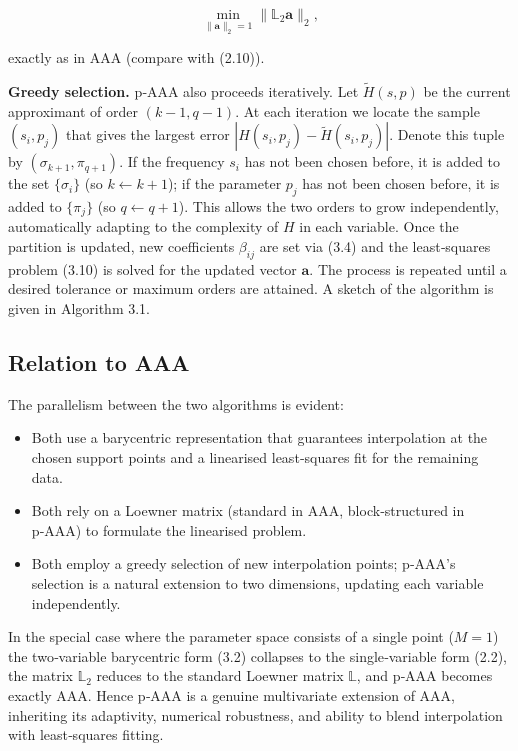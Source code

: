 \documentclass{article}
\begin{document}
\[
\min_{\|\mathbf{a}\|_2=1}\|\mathbb{L}_2\mathbf{a}\|_2,
\tag{3.10}
\]

exactly as in AAA (compare with (2.10)).

\textbf{Greedy selection.} p‑AAA also proceeds iteratively. Let \(\tilde{H}(s,p)\) be the current approximant of order \((k-1,q-1)\). At each iteration we locate the sample \((s_i,p_j)\) that gives the largest error \(|H(s_i,p_j)-\tilde{H}(s_i,p_j)|\). Denote this tuple by \((\sigma_{k+1},\pi_{q+1})\).  
If the frequency \(s_i\) has not been chosen before, it is added to the set \(\{\sigma_i\}\) (so \(k\leftarrow k+1\)); if the parameter \(p_j\) has not been chosen before, it is added to \(\{\pi_j\}\) (so \(q\leftarrow q+1\)). This allows the two orders to grow independently, automatically adapting to the complexity of \(H\) in each variable. Once the partition is updated, new coefficients \(\beta_{ij}\) are set via (3.4) and the least‑squares problem (3.10) is solved for the updated vector \(\mathbf{a}\). The process is repeated until a desired tolerance or maximum orders are attained. A sketch of the algorithm is given in Algorithm 3.1.

\subsection{Relation to AAA}

The parallelism between the two algorithms is evident:
\begin{itemize}
    \item Both use a barycentric representation that guarantees interpolation at the chosen support points and a linearised least‑squares fit for the remaining data.
    \item Both rely on a Loewner matrix (standard in AAA, block‑structured in p‑AAA) to formulate the linearised problem.
    \item Both employ a greedy selection of new interpolation points; p‑AAA’s selection is a natural extension to two dimensions, updating each variable independently.
\end{itemize}

In the special case where the parameter space consists of a single point (\(M=1\)) the two‑variable barycentric form (3.2) collapses to the single‑variable form (2.2), the matrix \(\mathbb{L}_2\) reduces to the standard Loewner matrix \(\mathbb{L}\), and p‑AAA becomes exactly AAA. Hence p‑AAA is a genuine multivariate extension of AAA, inheriting its adaptivity, numerical robustness, and ability to blend interpolation with least‑squares fitting.
\end{document}
